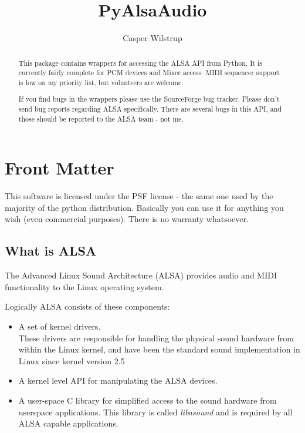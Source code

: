 \documentclass{howto}
\title{PyAlsaAudio}
\author{Casper Wilstrup}
\begin{document}
\maketitle

%
\ifhtml
\chapter*{Front Matter\label{front}}
\fi

This software is licensed under the PSF license - the same one used
by the majority of the python distribution. Basically you can use it
for anything you wish (even commercial purposes). There is no warranty
whatsoever.

\begin{abstract}
\noindent
This package contains wrappers for accessing the ALSA API from Python. It
is currently fairly complete for PCM devices and Mixer access. MIDI sequencer
support is low on my priority list, but volunteers are welcome.

If you find bugs in the wrappers please use the SourceForge bug tracker. Please
don't send bug reports regarding ALSA specifically. There are several
bugs in this API, and those should be reported to the ALSA team - not
me.
\end{abstract}

\tableofcontents

\section{What is ALSA}

The Advanced Linux Sound Architecture (ALSA) provides audio and MIDI
functionality to the Linux operating system. 

Logically ALSA consists of these components:
\begin{itemize}
  \item A set of kernel drivers.\\
        These drivers are responsible for handling the physical sound 
        hardware from within the Linux kernel, and have been the standard
        sound implementation in Linux since kernel version 2.5
  \item A kernel level API for manipulating the ALSA devices.
  \item A user-space C library for simplified access to the sound hardware
        from userspace applications. This library is called \textit{libasound}
        and is required by all ALSA capable applications.
\end{itemize}
\end{document}
